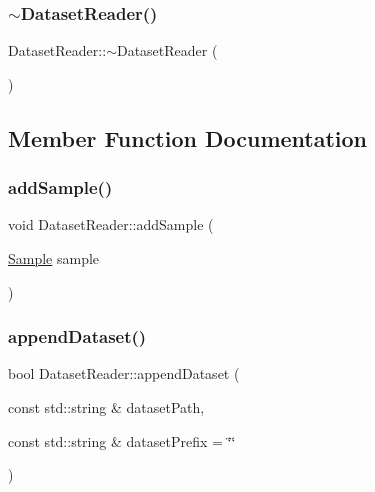 \mbox{\label{class_dataset_reader_af972d4b7460587b2292d3dd15e69827b}} 
\subsubsection{\texorpdfstring{$\sim$\+Dataset\+Reader()}{~DatasetReader()}}
{\footnotesize\ttfamily Dataset\+Reader\+::$\sim$\+Dataset\+Reader (\begin{DoxyParamCaption}{ }\end{DoxyParamCaption})\hspace{0.3cm}{\ttfamily [virtual]}}



\subsection{Member Function Documentation}
\mbox{\label{class_dataset_reader_a03ceb33ec8ecd5fb73a4b17e9701cbb3}} 
\subsubsection{\texorpdfstring{add\+Sample()}{addSample()}}
{\footnotesize\ttfamily void Dataset\+Reader\+::add\+Sample (\begin{DoxyParamCaption}\item[{\hyperlink{struct_sample}{Sample}}]{sample }\end{DoxyParamCaption})}

\mbox{\label{class_dataset_reader_a732438244cec7c20294f93c6b635888c}} 
\subsubsection{\texorpdfstring{append\+Dataset()}{appendDataset()}}
{\footnotesize\ttfamily bool Dataset\+Reader\+::append\+Dataset (\begin{DoxyParamCaption}\item[{const std\+::string \&}]{dataset\+Path,  }\item[{const std\+::string \&}]{dataset\+Prefix = {\ttfamily \char`\"{}\char`\"{}} }\end{DoxyParamCaption})\hspace{0.3cm}{\ttfamily [virtual]}}



